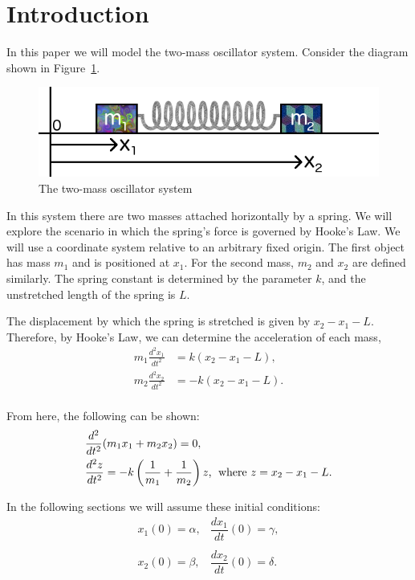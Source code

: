 \documentclass[11pt, oneside]{article}   	%
\begin{document}
\section{Introduction}
In this paper we will model the two-mass oscillator system.
Consider the diagram shown in Figure~\ref{sketch}.

\begin{figure}[h!]
\centering \includegraphics[scale=0.7]{sketch}
\caption{\label{sketch} The two-mass oscillator system}
\end{figure}

In this system there are two masses attached horizontally by a spring.
We will explore the scenario in which the spring's force is governed by Hooke's Law.
We will use a coordinate system relative to an arbitrary fixed origin.
The first object has mass $m_1$ and is positioned at $x_1$.
For the second mass, $m_2$ and $x_2$ are defined similarly.
The spring constant is determined by the parameter $k$, and the unstretched length of the spring is $L$.

The displacement by which the spring is stretched is given by $x_2 - x_1 -L$.
Therefore, by Hooke's Law, we can determine the acceleration of each mass,
\begin{align*}
m_1 \frac{d^2x_1}{dt^2} &= k(x_2 - x_1 - L), \\
m_2 \frac{d^2x_2}{dt^2} &= -k(x_2 - x_1 - L). \\
\end{align*}

From here, the following can be shown:
\begin{align}
&\frac{d^2}{dt^2}(m_1x_1 + m_2x_2) = 0, \label{eq:1}\\
&\frac{d^2z}{dt^2} = -k\left(\frac{1}{m_1}+\frac{1}{m_2}\right)z \text{, \;where } z = x_2-x_1-L. \label{eq:2}
\end{align}

In the following sections we will assume these initial conditions:
$$\begin{matrix}
x_1(0) = \alpha, & \dfrac{dx_1}{dt}(0) = \gamma, \\ &\\
x_2(0) = \beta, & \dfrac{dx_2}{dt}(0) = \delta.
\end{matrix}$$
\end{document}
